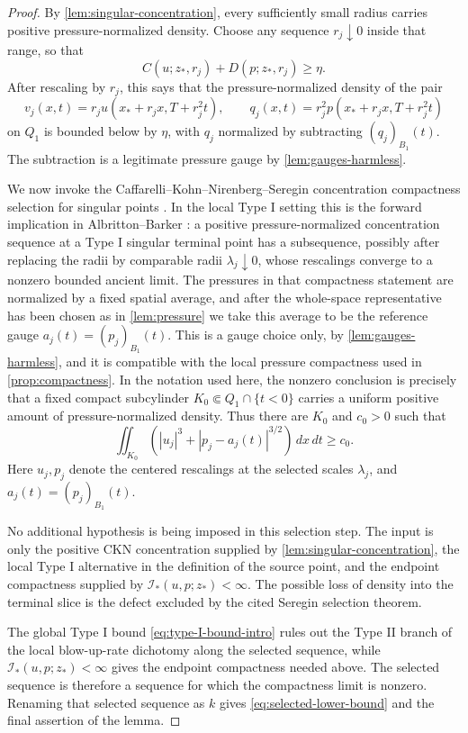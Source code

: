 \documentclass[11pt]{amsart}
\theoremstyle{plain}
\theoremstyle{definition}
\theoremstyle{remark}
\numberwithin{equation}{section}
\newcommand{\calI}{\mathcal I}
\begin{document}
\begin{proof}
By \cref{lem:singular-concentration}, every sufficiently small radius carries
positive pressure-normalized density.  Choose any sequence \(r_j\downarrow0\)
inside that range, so that
\[
   C(u;z_*,r_j)+D(p;z_*,r_j)\ge \eta .
\]
After rescaling by \(r_j\), this says that the pressure-normalized density of
the pair
\[
   v_j(x,t)=r_j u(x_*+r_jx,T+r_j^2t),\qquad
   q_j(x,t)=r_j^2p(x_*+r_jx,T+r_j^2t)
\]
on \(Q_1\) is bounded below by \(\eta\), with \(q_j\) normalized by subtracting
\((q_j)_{B_1}(t)\).  The subtraction is a legitimate pressure gauge by
\cref{lem:gauges-harmless}.

We now invoke the Caffarelli--Kohn--Nirenberg--Seregin concentration
compactness selection for singular points
\cite{CKN1982,Lin1998,Seregin2012}.  In the local Type I setting this is the
forward implication in Albritton--Barker
\cite[Theorem 1.1]{AlbrittonBarker2019}: a positive
pressure-normalized concentration sequence at a Type I singular terminal point
has a subsequence, possibly after replacing the radii by comparable radii
\(\lambda_j\downarrow0\), whose rescalings converge to a nonzero bounded
ancient limit.  The pressures in that compactness statement are normalized by
a fixed spatial average, and after the whole-space representative has been
chosen as in \cref{lem:pressure} we take this average to be the reference
gauge \(a_j(t)=(p_j)_{B_1}(t)\).  This is a gauge choice only, by
\cref{lem:gauges-harmless}, and it is compatible with the local pressure
compactness used in \cref{prop:compactness}.  In the notation used here, the
nonzero conclusion is precisely that a fixed compact subcylinder
\(K_0\Subset Q_1\cap\{t<0\}\) carries a uniform positive amount of
pressure-normalized density.  Thus there are \(K_0\) and \(c_0>0\) such that
\[
   \iint_{K_0}
   \left(|u_j|^3+|p_j-a_j(t)|^{3/2}\right)\,dx\,dt\ge c_0 .
\]
Here \(u_j,p_j\) denote the centered rescalings at the selected scales
\(\lambda_j\), and \(a_j(t)=(p_j)_{B_1}(t)\).

No additional hypothesis is being imposed in this selection step.  The input is
only the positive CKN concentration supplied by
\cref{lem:singular-concentration}, the local Type I alternative in the
definition of the source point, and the endpoint compactness supplied by
\(\calI_*(u,p;z_*)<\infty\).  The possible loss of density into the terminal
slice is the defect excluded by the cited Seregin selection theorem.

The global Type I bound \eqref{eq:type-I-bound-intro} rules out the Type II
branch of the local blow-up-rate dichotomy along the selected sequence, while
\(\calI_*(u,p;z_*)<\infty\) gives the endpoint compactness needed above.
The selected sequence is therefore a sequence for which the compactness limit
is nonzero.  Renaming that selected sequence as \(k\) gives
\eqref{eq:selected-lower-bound} and the final assertion of the lemma.
\end{proof}
\end{document}
